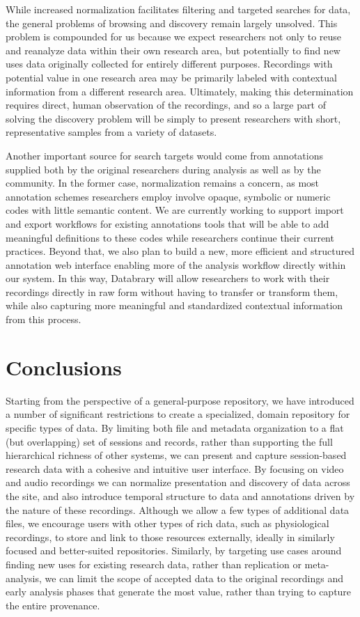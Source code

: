 \documentclass{sig-alternate}
\begin{document}
While increased normalization facilitates filtering and targeted searches for data, the general problems of browsing and discovery remain largely unsolved.
This problem is compounded for us because we expect researchers not only to reuse and reanalyze data within their own research area, but potentially to find new uses data originally collected for entirely different purposes.
Recordings with potential value in one research area may be primarily labeled with contextual information from a different research area.
Ultimately, making this determination requires direct, human observation of the recordings, and so a large part of solving the discovery problem will be simply to present researchers with short, representative samples from a variety of datasets.

Another important source for search targets would come from annotations supplied both by the original researchers during analysis as well as by the community. 
In the former case, normalization remains a concern, as most annotation schemes researchers employ involve opaque, symbolic or numeric codes with little semantic content.
We are currently working to support import and export workflows for existing annotations tools that will be able to add meaningful definitions to these codes while researchers continue their current practices.
Beyond that, we also plan to build a new, more efficient and structured annotation web interface enabling more of the analysis workflow directly within our system.
In this way, Databrary will allow researchers to work with their recordings directly in raw form without having to transfer or transform them, while also capturing more meaningful and standardized contextual information from this process.

\section{Conclusions}

Starting from the perspective of a general-purpose repository, we have introduced a number of significant restrictions to create a specialized, domain repository for specific types of data.
By limiting both file and metadata organization to a flat (but overlapping) set of sessions and records, rather than supporting the full hierarchical richness of other systems, we can present and capture session-based research data with a cohesive and intuitive user interface.
By focusing on video and audio recordings we can normalize presentation and discovery of data across the site, and also introduce temporal structure to data and annotations driven by the nature of these recordings.
Although we allow a few types of additional data files, we encourage users with other types of rich data, such as physiological recordings, to store and link to those resources externally, ideally in similarly focused and better-suited repositories.
Similarly, by targeting use cases around finding new uses for existing research data, rather than replication or meta-analysis, we can limit the scope of accepted data to the original recordings and early analysis phases that generate the most value, rather than trying to capture the entire provenance.
\end{document}
